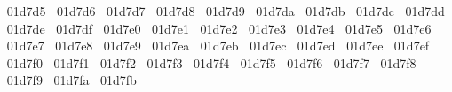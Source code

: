 {  ^^^^^^01d7d5%
  ^^^^^^01d7d6%
  ^^^^^^01d7d7%
  ^^^^^^01d7d8%
  ^^^^^^01d7d9%
  ^^^^^^01d7da%
  ^^^^^^01d7db%
  ^^^^^^01d7dc%
  ^^^^^^01d7dd%
  ^^^^^^01d7de%
  ^^^^^^01d7df%
  ^^^^^^01d7e0%
  ^^^^^^01d7e1%
  ^^^^^^01d7e2%
  ^^^^^^01d7e3%
  ^^^^^^01d7e4%
  ^^^^^^01d7e5%
  ^^^^^^01d7e6%
  ^^^^^^01d7e7%
  ^^^^^^01d7e8%
  ^^^^^^01d7e9%
  ^^^^^^01d7ea%
  ^^^^^^01d7eb%
  ^^^^^^01d7ec%
  ^^^^^^01d7ed%
  ^^^^^^01d7ee%
  ^^^^^^01d7ef%
  ^^^^^^01d7f0%
  ^^^^^^01d7f1%
  ^^^^^^01d7f2%
  ^^^^^^01d7f3%
  ^^^^^^01d7f4%
  ^^^^^^01d7f5%
  ^^^^^^01d7f6%
  ^^^^^^01d7f7%
  ^^^^^^01d7f8%
  ^^^^^^01d7f9%
  ^^^^^^01d7fa%
  ^^^^^^01d7fb%
}
